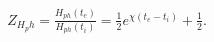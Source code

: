 \begin{equation}
\begin{array}{l}
Z_{H_ph}=\frac{H_{ph}(t_e)}{H_{ph}(t_i)}
        =\frac{1}{2} e^{\chi(t_e-t_i)}+\frac{1}{2}.
\end{array}
\end{equation}

